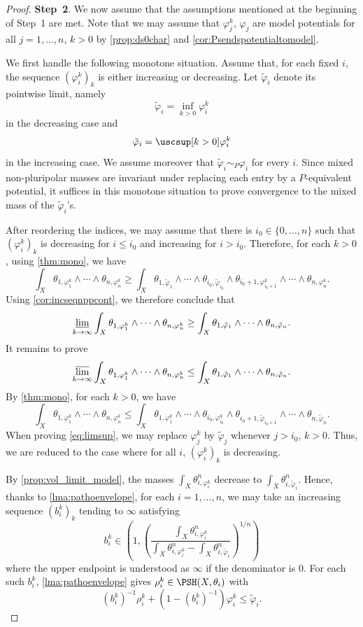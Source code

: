 \begin{proof}
    \textbf{Step~2}. We now assume that the assumptions mentioned at the beginning of Step~1 are met. Note that we may assume that $\varphi_j^k$, $\varphi_j$ are model potentials for all $j=1,\ldots,n$, $k>0$ by \cref{prop:ds0char} and \cref{cor:Psendspotentialtomodel}.

    We first handle the following monotone situation. Assume that, for each fixed $i$, the sequence $(\varphi_i^k)_k$ is either increasing or decreasing. Let $\tilde{\varphi}_i$ denote its pointwise limit, namely
\[
\tilde{\varphi}_i=\inf_{k>0}\varphi_i^k
\]
in the decreasing case and
\[
\tilde{\varphi}_i=\uscsup[k>0]\varphi_i^k
\]
in the increasing case. We assume moreover that $\tilde{\varphi}_i\sim_P\varphi_i$ for every $i$. Since mixed non-pluripolar masses are invariant under replacing each entry by a $P$-equivalent potential, it suffices in this monotone situation to prove convergence to the mixed mass of the $\tilde{\varphi}_i$'s.

After reordering the indices, we may assume that there is $i_0\in \{0,\ldots,n\}$ such that $(\varphi_i^k)_k$ is decreasing for $i\leq i_0$ and increasing for $i>i_0$. Therefore, for each $k>0$, using \cref{thm:mono}, we have
\[
\int_X \theta_{1,\varphi_1^k}\wedge\cdots\wedge\theta_{n,\varphi_n^k}\geq \int_X \theta_{1,\tilde{\varphi}_1}\wedge\cdots\wedge \theta_{i_0,\tilde{\varphi}_{i_0}}\wedge \theta_{i_0+1,\varphi^k_{i_0+1}}\wedge \cdots  \wedge\theta_{n,\varphi_n^k}.
\]
Using \cref{cor:incseqnppcont}, we therefore conclude that
\[
\varliminf_{k\to\infty}\int_X \theta_{1,\varphi_1^k}\wedge\cdots\wedge\theta_{n,\varphi_n^k}\geq \int_X \theta_{1,\tilde{\varphi}_1}\wedge\cdots\wedge\theta_{n,\tilde{\varphi}_n}.
\]
It remains to prove
	\begin{equation}\label{eq:limsup}
		\varlimsup_{k\to\infty}\int_X \theta_{1,\varphi_1^k}\wedge\cdots\wedge\theta_{n,\varphi_n^k}\leq\int_X \theta_{1,\tilde{\varphi}_1}\wedge\cdots\wedge\theta_{n,\tilde{\varphi}_n}.
	\end{equation}
By \cref{thm:mono}, for each $k>0$, we have
\[
\int_X \theta_{1,\varphi_1^k}\wedge\cdots\wedge\theta_{n,\varphi_n^k}\leq \int_X \theta_{1,\varphi_1^k}\wedge \cdots \wedge \theta_{i_0,\varphi_{i_0}^k}\wedge \theta_{i_0+1,\tilde{\varphi}_{i_0+1}}\wedge \cdots\wedge \theta_{n,\tilde{\varphi}_{n}}.
\]
When proving \eqref{eq:limsup}, we may replace $\varphi_j^k$ by $\tilde{\varphi}_j$ whenever $j>i_0$, $k>0$.
Thus, we are reduced to the case where for all $i$, $(\varphi_i^k)_k$ is decreasing.

By \cref{prop:vol_limit_model}, the masses $\int_X\theta_{i,\varphi_i^k}^n$ decrease to $\int_X\theta_{i,\tilde{\varphi}_i}^n$. Hence, thanks to \cref{lma:pathoenvelope}, for each $i=1,\ldots,n$, we may take an increasing sequence $(b^k_i)_k$ tending to $\infty$ satisfying
\[
b_i^k\in \left(1, \left( \frac{\int_X \theta_{i,\varphi_i^k}^n}{\int_X \theta_{i,\varphi_i^k}^n-\int_X \theta_{i,\tilde{\varphi}_i}^n} \right)^{1/n} \right)
\]
where the upper endpoint is understood as $\infty$ if the denominator is $0$. For each such $b_i^k$, \cref{lma:pathoenvelope} gives $\rho_i^k\in \PSH(X,\theta_i)$ with
\[
	(b^k_i)^{-1}\rho_i^k+\left(1-(b^k_i)^{-1}\right)\varphi_i^k\leq \tilde{\varphi}_i.
\]


\end{proof}
